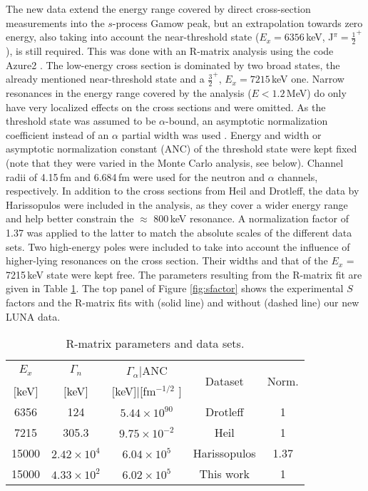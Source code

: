\documentclass[%
reprint,
groupedaddress,
showpacs,
nofootinbib,
amsmath,amssymb,
aps,
prl,
superscriptaddress,
notitlepage,
floatfix
]{revtex4-2}
\begin{document}
The new data extend the energy range covered by direct cross-section measurements into the $s$-process Gamow peak, but an extrapolation towards zero energy, also taking into account the near-threshold state ($E_x = 6356$\,keV, J$^{\pi} = \frac{1}{2}^+$), is still required. This was done with an R-matrix analysis using the code Azure2 \cite{Azuma:2010}. The low-energy cross section is dominated by two broad states, the already mentioned 
near-threshold state and a $\frac{3}{2}^+$, $E_x = 7215$\,keV one. Narrow resonances in the energy range covered by the analysis ($E<1.2$\,MeV) do only have very localized effects on the cross sections and were omitted. As the threshold state was assumed to be $\alpha$-bound, an asymptotic normalization coefficient instead of an $\alpha$ partial width was used \cite{Avila2015}. Energy and width or asymptotic normalization constant (ANC) of the threshold state were kept fixed (note that they were varied in the Monte Carlo analysis, see below). Channel radii of 4.15\,fm and 6.684\,fm were used for the neutron and $\alpha$ channels, respectively. In addition to the cross sections from Heil and Drotleff, the data by Harissopulos \cite{Harrisopulos:2005} were included in the analysis, as they cover a wider energy range and help better constrain the $\approx$ 800\,keV resonance. A normalization factor of 1.37 was applied to the latter to match the absolute scales of the different data sets. Two high-energy poles were included to take into account the influence of higher-lying resonances on the cross section. Their widths and that of the $E_x$ = 7215\,keV state were kept free. The parameters resulting from the R-matrix fit are given in Table \ref{tab:rmatrix}. The top panel of Figure \ref{fig:sfactor} shows the experimental $S$ factors and the R-matrix fits with (solid line) and without (dashed line) our new LUNA data.

\begin{table}[tb]
\caption{R-matrix parameters and data sets.}
\begin{ruledtabular}
\begin{tabular}{ccc|cc}
    $E_x$  &  $\Gamma_n$ & $\Gamma_{\alpha}|$ANC & \multirow{2}{*}{Dataset} & \multirow{2}{*}{Norm.} \\
 $[$keV$]$ & $[$keV$]$ & $[$keV]$|$[fm$^{-1/2}$ $]$ & & \\
\hline
6356 & 124 & $5.44 \times 10^{90}$ & Drotleff \cite{Drotleff:1993} & 1 \\
7215 & 305.3  & $9.75 \times 10^{-2}$ & Heil \cite{Heil:2008a} & 1 \\
15000 & $2.42 \times 10^{4}$ & $6.04 \times 10^{5}$ & Harissopulos \cite{Harrisopulos:2005} & 1.37 \\
15000 & $4.33 \times 10^{2}$ & $6.02 \times 10^{5}$ & This work & 1 \\
\end{tabular}
\end{ruledtabular}
\label{tab:rmatrix}
\end{table}
\end{document}
